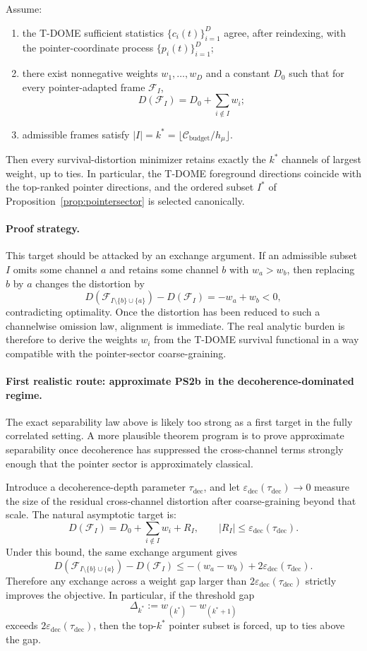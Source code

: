\documentclass[12pt]{article}
\theoremstyle{definition}
\theoremstyle{remark}
\begin{document}
Assume:
\begin{enumerate}
\item the T-DOME sufficient statistics \(\{c_i(t)\}_{i=1}^D\) agree,
  after reindexing, with the pointer-coordinate process
  \(\{p_i(t)\}_{i=1}^D\);
\item there exist nonnegative weights \(w_1,\dots,w_D\) and a constant
  \(D_0\) such that for every pointer-adapted frame \(\mathcal F_I\),
  \[
  D(\mathcal F_I)=D_0+\sum_{i\notin I} w_i;
  \]
\item admissible frames satisfy \(|I|=k^*=
  \lfloor \mathcal C_{\mathrm{budget}}/h_\mu\rfloor\).
\end{enumerate}
Then every survival-distortion minimizer retains exactly the
\(k^*\) channels of largest weight, up to ties. In particular, the
T-DOME foreground directions coincide with the top-ranked pointer
directions, and the ordered subset \(I^*\) of
Proposition~\ref{prop:pointersector} is selected canonically.

\paragraph{Proof strategy.}
This target should be attacked by an exchange argument. If an admissible
subset \(I\) omits some channel \(a\) and retains some channel \(b\)
with \(w_a>w_b\), then replacing \(b\) by \(a\) changes the distortion
by
\[
D(\mathcal F_{I\setminus\{b\}\cup\{a\}})-D(\mathcal F_I)
=-w_a+w_b<0,
\]
contradicting optimality. Once the distortion has been reduced to such a
channelwise omission law, alignment is immediate. The real analytic
burden is therefore to derive the weights \(w_i\) from the T-DOME
survival functional in a way compatible with the pointer-sector
coarse-graining.

\paragraph{First realistic route: approximate PS2b in the
decoherence-dominated regime.}
The exact separability law above is likely too strong as a first target
in the fully correlated setting. A more plausible theorem program is to
prove approximate separability once decoherence has suppressed the
cross-channel terms strongly enough that the pointer sector is
approximately classical.

Introduce a decoherence-depth parameter \(\tau_{\mathrm{dec}}\), and let
\(\varepsilon_{\mathrm{dec}}(\tau_{\mathrm{dec}})\to 0\) measure the
size of the residual cross-channel distortion after coarse-graining
beyond that scale. The natural asymptotic target is:
\[
D(\mathcal F_I)
=
D_0+\sum_{i\notin I} w_i + R_I,
\qquad
|R_I|\le \varepsilon_{\mathrm{dec}}(\tau_{\mathrm{dec}}).
\]
Under this bound, the same exchange argument gives
\[
D(\mathcal F_{I\setminus\{b\}\cup\{a\}})-D(\mathcal F_I)
\le
-(w_a-w_b)+2\varepsilon_{\mathrm{dec}}(\tau_{\mathrm{dec}}).
\]
Therefore any exchange across a weight gap larger than
\(2\varepsilon_{\mathrm{dec}}(\tau_{\mathrm{dec}})\) strictly improves
the objective. In particular, if the threshold gap
\[
\Delta_{k^*}:=w_{(k^*)}-w_{(k^*+1)}
\]
exceeds \(2\varepsilon_{\mathrm{dec}}(\tau_{\mathrm{dec}})\), then the
top-\(k^*\) pointer subset is forced, up to ties above the gap.
\end{document}
